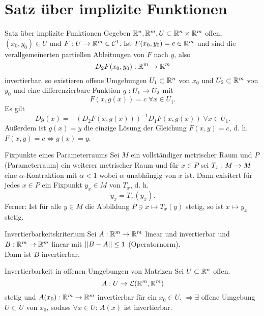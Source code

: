 \documentclass[main.tex]{subfiles}
\begin{document}
\section*{Satz über implizite Funktionen}

\begin{karte}{Satz über implizite Funktionen}
    Gegeben \( \mathbb{R}^n, \mathbb{R}^m, U \subset \mathbb{R}^n \times \mathbb{R}^m \) 
    offen, \( (x_0,y_0)\in U \) und \( F : U \rightarrow \mathbb{R}^m \in \mathcal{C}^1 \). 
    Ist \( F(x_0, y_0) = c\in \mathbb{R}^m \) und sind die verallgemeinerten partiellen 
    Ableitungen von \( F \) nach \( y \), also 
    \[ D_2 F(x_0, y_0) : \mathbb{R}^m \rightarrow \mathbb{R}^m \] 
    invertierbar, so existieren offene Umgebungen \( U_1 \subset \mathbb{R}^n \) 
    von \(x_0\) und \( U_2 \subset \mathbb{R}^m \) von \(y_0\) und eine 
    differenzierbare Funktion \( g : U_1 \rightarrow U_2 \) mit 
    \[ F(x, g(x)) = c \;\forall x\in U_1. \]
    Es gilt 
    \[ Dg(x) = -(D_2 F(x,g(x)))^{-1} D_1 F(x,g(x)) \;\forall x\in U_1. \]
    Außerdem ist \( g(x) = y \) die einzige Lösung der Gleichung 
    \( F(x,y) = c \), d. h. \( F(x,y) = c \Leftrightarrow g(x) = y \).
\end{karte}

\begin{karte}{Fixpunkte eines Parameterraums}
    Sei \( M \) ein vollständiger metrischer Raum und \( P \) 
    (Parameterraum) ein weiterer metrischer Raum und für \( x\in P \)     
    sei \(T_x : M \rightarrow M\) eine \(\alpha\)-Kontraktion mit \(\alpha < 1\)
    wobei \(\alpha\) unabhängig von \(x\) ist. Dann exisitert für jedes \(x \in P\)
    ein Fixpunkt \(y_x \in M\) von \(T_x\), d. h. 
    \[ y_x = T_x(y_x). \]
    Ferner: Ist für alle \(y \in M\) die Abbildung 
    \(P \ni x \mapsto T_x(y)\) stetig, so ist
    \( x \mapsto y_x \) stetig.
\end{karte}

\begin{karte}{Invertierbarkeitskriterium}
    Sei \( A : \mathbb{R}^m \rightarrow \mathbb{R}^m \) linear und 
    invertierbar und \( B : \mathbb{R}^m \rightarrow \mathbb{R}^m \) 
    linear mit \(\left|\left|B-A\right|\right| \leq 1\) (Operatornorm). \\
    Dann ist \( B \) invertierbar.
\end{karte}

\begin{karte}{Invertierbarkeit in offenen Umgebungen von Matrizen}
    Sei \( U \subset \mathbb{R}^n \) offen. 
    \[ A : U \rightarrow \mathcal{L}(\mathbb{R}^m, \mathbb{R}^m) \]
    stetig und \( A(x_0) : \mathbb{R}^m \rightarrow \mathbb{R}^m \) invertierbar 
    für ein \( x_0 \in U \). \( \Rightarrow \exists \) offene Umgebung 
    \( \tilde{U} \subset U \) von \( x_0 \), sodass \( \forall x \in \tilde{U} \): 
    \( A(x) \) ist invertierbar.
\end{karte}
\end{document}
